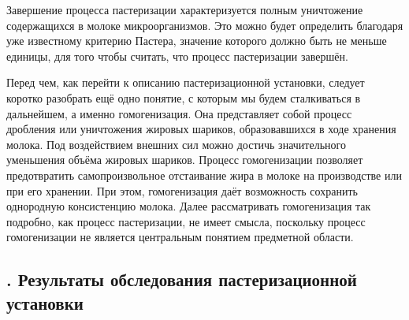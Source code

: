 {  \par \redline Завершение процесса пастеризации характеризуется полным уничтожение содержащихся в молоке микроорганизмов. Это можно будет определить благодаря уже известному критерию Пастера, значение которого должно быть не меньше единицы, для того чтобы считать, что процесс пастеризации завершён.

  \par \redline 	Перед чем, как перейти к описанию пастеризационной установки, следует коротко разобрать ещё одно понятие, с которым мы будем сталкиваться в дальнейшем, а именно гомогенизация. Она представляет собой процесс дробления или уничтожения жировых шариков, образовавшихся в ходе хранения молока. Под воздействием внешних сил можно достичь значительного уменьшения объёма жировых шариков. Процесс гомогенизации позволяет предотвратить самопроизвольное отстаивание жира в молоке на производстве или при его хранении. При этом, гомогенизация даёт возможность сохранить однородную консистенцию молока. Далее рассматривать гомогенизация так подробно, как процесс пастеризации, не имеет смысла, поскольку процесс гомогенизации не является центральным понятием предметной области.

  \par
}

\subtitlespace

\subsection*{ 
  \gostTitleFont
  \redline
  \thechaptercntr .\thesubchaptercntr \spc
  Результаты обследования пастеризационной установки
} \addtocounter{subchaptercntr}{1}

\subtitlespace

